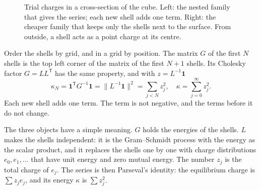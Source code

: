 \documentclass[journal]{IEEEtran}
\newcommand{\one}{\mathbf 1}
\newcommand{\T}{\mathsf T}
\begin{document}
\begin{figure}[!t]
\centering
{}
\caption{Trial charges in a cross-section of the cube. Left: the nested family that gives the series; each new shell adds one term. Right: the cheaper family that keeps only the shells next to the surface. From outside, a shell acts as a point charge at its centre.}
\label{fig:shells}
\end{figure}

Order the shells by grid, and in a grid by position. The matrix $G$ of the first $N$ shells is the top left corner of the matrix of the first $N+1$ shells. Its Cholesky factor $G = LL^{\T}$ has the same property, and with $z = L^{-1}\one$
\begin{equation}
\kappa_N = \one^{\T} G^{-1} \one = \lVert L^{-1}\one\rVert^2 = \sum_{j<N} z_j^2,
\quad
\kappa = \sum_{j=0}^{\infty} z_j^2 .
\label{eq:series}
\end{equation}
Each new shell adds one term. The term is not negative, and the terms before it do not change.

The three objects have a simple meaning. $G$ holds the energies of the shells. $L$ makes the shells independent: it is the Gram--Schmidt process with the energy as the scalar product, and it replaces the shells one by one with charge distributions $e_0, e_1, \dots$ that have unit energy and zero mutual energy. The number $z_j$ is the total charge of $e_j$. The series is then Parseval's identity: the equilibrium charge is $\sum z_j e_j$, and its energy $\kappa$ is $\sum z_j^2$.
\end{document}
